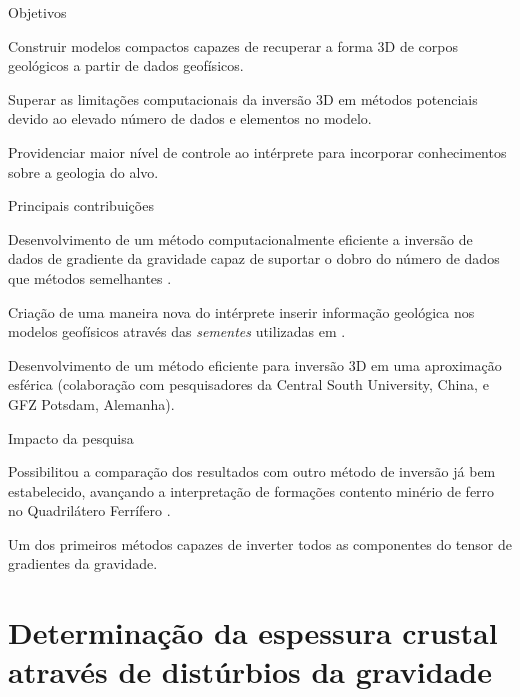 \documentclass[10pt,a4paper,oneside]{book}
\begin{document}
\begin{fancyenum}{\faBullseye}{Objetivos}
   \item Construir modelos compactos capazes de recuperar a forma 3D de corpos
     geológicos a partir de dados geofísicos.
   \item Superar as limitações computacionais da inversão 3D em métodos
     potenciais devido ao elevado número de dados e elementos no modelo.
   \item Providenciar maior nível de controle ao intérprete para incorporar
     conhecimentos sobre a geologia do alvo.
\end{fancyenum}
\begin{fancyenum}{\faLightbulb}{Principais contribuições}
  \item Desenvolvimento de um método computacionalmente eficiente a inversão
    de dados de gradiente da gravidade capaz de suportar o dobro do número
    de dados que métodos semelhantes \citep{Uieda2012,Carlos2016}.
  \item Criação de uma maneira nova do intérprete inserir informação geológica
    nos modelos geofísicos através das \textit{sementes} utilizadas em
    \citet{Uieda2012}.
  \item Desenvolvimento de um método eficiente para inversão 3D em uma
    aproximação esférica \citep{Zhao2019} (colaboração com pesquisadores da
    Central South University, China, e GFZ Potsdam, Alemanha).
\end{fancyenum}
\begin{fancyenum}{\faRocket}{Impacto da pesquisa}
  \item Possibilitou a comparação dos resultados com outro método de inversão
    já bem estabelecido, avançando a interpretação de formações contento
    minério de ferro no Quadrilátero Ferrífero \citep{Carlos2014,Carlos2016}.
  \item Um dos primeiros métodos capazes de inverter todos as componentes do
    tensor de gradientes da gravidade.
\end{fancyenum}


\section{Determinação da espessura crustal através de distúrbios da gravidade}
\end{document}
